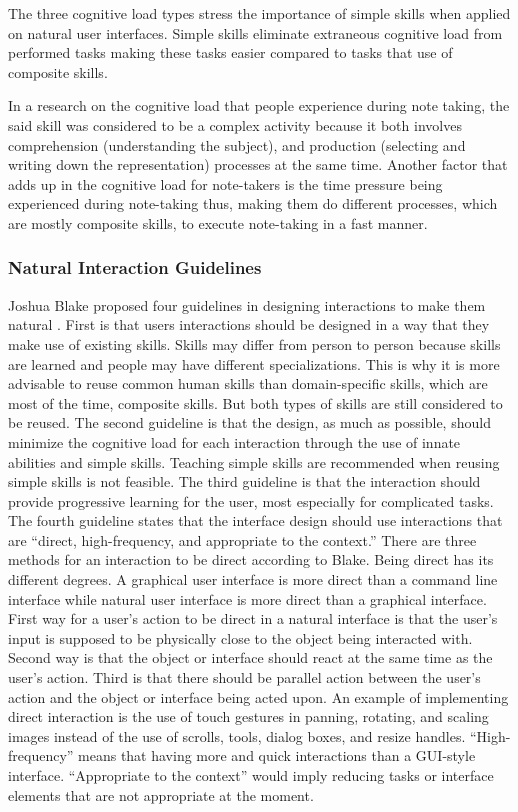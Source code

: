The three cognitive load types stress the importance of simple skills when applied on natural user interfaces. Simple skills eliminate extraneous cognitive load from performed tasks making these tasks easier compared to tasks that use of composite skills.

In a research \cite{piolat2005cogeffort} on the cognitive load that people experience during note taking, the said skill was considered to be a complex activity because it both involves comprehension (understanding the subject), and production (selecting and writing down the representation) processes at the same time. Another factor that adds up in the cognitive load for note-takers is the time pressure being experienced during note-taking thus, making them do different processes, which are mostly composite skills, to execute note-taking in a fast manner.

\subsubsection{Natural Interaction Guidelines}

Joshua Blake proposed four guidelines in designing interactions to make them natural \cite{blake2011natural}. First is that users interactions should be designed in a way that they make use of existing skills. Skills may differ from person to person because skills are learned and people may have different specializations. This is why it is more advisable to reuse common human skills than domain-specific skills, which are most of the time, composite skills. But both types of skills are still considered to be reused. The second guideline is that the design, as much as possible, should minimize the cognitive load for each interaction through the use of innate abilities and simple skills. Teaching simple skills are recommended when reusing simple skills is not feasible. The third guideline is that the interaction should provide progressive learning for the user, most especially for complicated tasks. The fourth guideline states that the interface design should use interactions that are ``direct, high-frequency, and appropriate to the context.'' There are three methods for an interaction to be direct according to Blake. Being direct has its different degrees. A graphical user interface is more direct than a command line interface while natural user interface is more direct than a graphical interface. First way for a user's action to be direct in a natural interface is that the user's input is supposed to be physically close to the object being interacted with. Second way is that the object or interface should react at the same time as the user's action. Third is that there should be parallel action between the user's action and the object or interface being acted upon. An example of implementing direct interaction is the use of touch gestures in panning, rotating, and scaling images instead of the use of scrolls, tools, dialog boxes, and resize handles. ``High-frequency'' means that having more and quick interactions than a GUI-style interface. ``Appropriate to the context'' would imply reducing tasks or interface elements that are not appropriate at the moment.

